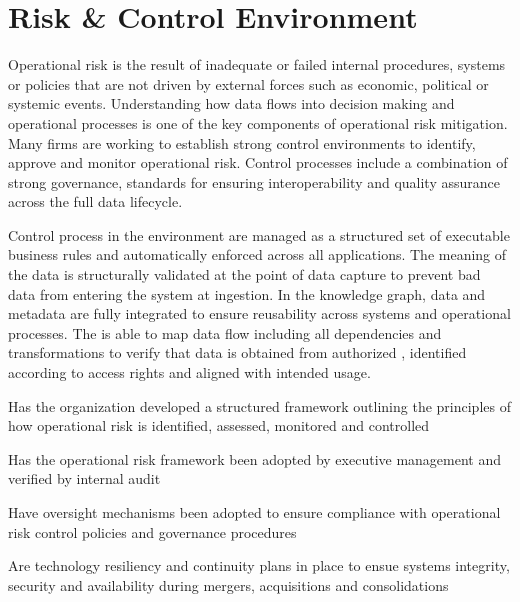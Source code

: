 \section{Risk \& Control Environment}\label{sec:ekgmm-b-4-6} %

Operational risk is the result of inadequate or failed internal procedures,
systems or policies that are not driven by external forces such as economic, political or systemic events.
Understanding how data flows into decision making and operational processes is one of the key components of operational risk mitigation.
Many firms are working to establish strong control environments to identify, approve and monitor operational risk.
Control processes include a combination of strong governance, standards for ensuring interoperability and quality assurance across the full data lifecycle.

\kgmmekgrationalesection

Control process in the  environment are managed as a structured set of executable business rules and automatically enforced across all applications.
The meaning of the data is structurally validated at the point of data capture to prevent bad data from entering the system at ingestion.
In the knowledge graph, data and metadata are fully integrated to ensure reusability across systems and operational processes.
The  is able to map data flow including all dependencies and transformations to verify that data is obtained from authorized ,
identified according to access rights and aligned with intended usage.

\kgmmcorequestionssection

\begin{core-questions}

  \item [\thesection.1] Has the organization developed a structured framework outlining the principles of how operational risk is identified, assessed, monitored and controlled
  \item [\thesection.2] Has the operational risk framework been adopted by executive management and verified by internal audit
  \item [\thesection.3] Have oversight mechanisms been adopted to ensure compliance with operational risk control policies and governance procedures
  \item [\thesection.4] Are technology resiliency and continuity plans in place to ensue systems integrity, security and availability during mergers, acquisitions and consolidations

\end{core-questions}

